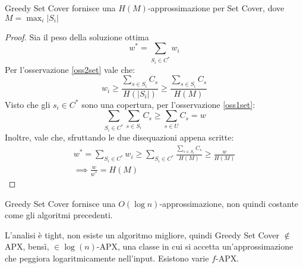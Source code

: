 \begin{theorem}
    Greedy Set Cover fornisce una $H(M)$-approssimazione per Set Cover, dove $M=\max_i|S_i|$
\end{theorem}
\begin{proof}
    Sia il peso della soluzione ottima $$w^* = \sum_{S_i \in C^*} w_i$$
    Per l'osservazione \ref{oss2set} vale che: 
    $$w_i \geq \frac{\sum_{s \in S_i}C_s}{H(|S_i|)} \geq \frac{\sum_{s \in S_i}C_s}{H(M)}$$
    Visto che gli $s_i \in C^*$ sono una copertura, per l'osservazione \ref{oss1set}:
    $$\sum_{S_i \in C^*}\sum_{s \in S_i}C_s \geq \sum_{s \in U} C_s = w$$
    Inoltre, vale che, sfruttando le due disequazioni appena scritte: 
    \begin{equation}
        \begin{aligned}
            w^* = \sum_{S_i \in C^*} w_i \geq \sum_{S_i \in C^*}\frac{\sum_{s \in S_i}C_s}{H(M)} \geq \frac{w}{H(M)}\\
            \implies \frac{w}{w^*} = H(M)
        \end{aligned}
    \end{equation}
\end{proof}
\begin{corollary}
    Greedy Set Cover fornisce una $O(\log n)$-approssimazione, non quindi costante 
    come gli algoritmi precedenti.
\end{corollary}
\begin{remark}
    L'analisi è tight, non esiste un algoritmo migliore, quindi
    Greedy Set Cover $\notin$ APX, bensì, $\in \log(n)$-APX, una classe in cui 
    si accetta un'approssimazione che peggiora logaritmicamente nell'input.
    Esistono varie $f$-APX.
\end{remark}
